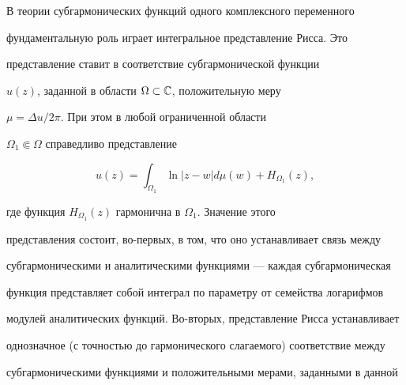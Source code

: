 \date{}




\pagestyle{plain} %







\maketitle


\label{begin}








В теории субгармонических функций одного комплексного переменного


фундаментальную роль играет интегральное представление Рисса. Это 


представление ставит в соответствие субгармонической функции


$u(z)$, заданной в области $\Omega\subset\Bbb C$, положительную меру 


$\mu=\Delta u/2\pi$. При этом в любой ограниченной области


$\Omega_1\Subset\Omega$ справедливо представление


$$




u(z)=\int_{\Omega_1}\ln |z-w| d\mu (w)+H_{\Omega_1}(z),   




$$


где функция $H_{\Omega_1}(z)$ гармонична в $\Omega_1$. Значение этого 


представления состоит, во-первых, в том, что оно устанавливает связь между 


субгармоническими и аналитическими функциями --- каж\-дая субгармоническая 


функция представляет собой интеграл по параметру от семейства логарифмов 


модулей аналитических функций. Во-вторых, представление Рисса устанавливает 


однозначное (с точностью до гармонического слагаемого) соответствие между 


субгармоническими функциями и положительными мерами, заданными в данной 


